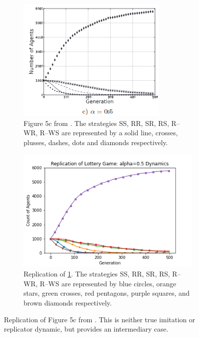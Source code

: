 \FloatBarrier 
\begin{figure}[!h]
  \begin{subfigure}[b]{0.45\textwidth}
    \includegraphics[width=\textwidth]{images/lottery3.png}
    \caption{Figure 5c from \cite{RN30}. The strategies SS, RR, SR, RS, R--WR, R--WS are represented by a solid line, crosses, plusses, dashes, dots and diamonds respectively. }
    \label{lottery3}
  \end{subfigure}
  \hfill
  \begin{subfigure}[b]{0.45\textwidth}
    \includegraphics[width=1.25\textwidth]{images/lottery3_me.png}
    \caption{Replication of \ref{lottery3}. The strategies SS, RR, SR, RS, R--WR, R--WS are represented by blue circles, orange stars, green crosses, red pentagons, purple squares, and brown diamonds respectively. }
    \label{lottery3_me}
  \end{subfigure}
  \caption{Replication of Figure 5c from \cite{RN30}. This is neither true imitation or replicator dynamic, but provides an intermediary case.} \label{lottery_comp2}
\end{figure} 
\FloatBarrier

